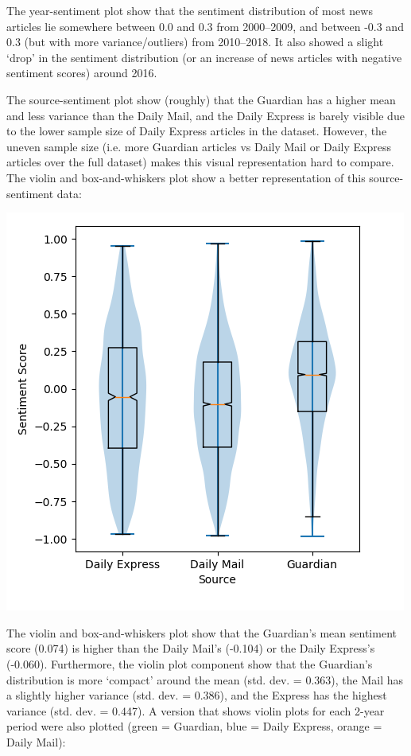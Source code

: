 \documentclass{report}
\begin{document}
The year-sentiment plot show that the sentiment distribution of most news articles lie somewhere between 0.0 and 0.3 from 2000--2009, and between -0.3 and 0.3 (but with more variance/outliers) from 2010--2018. 
It also showed a slight `drop' in the sentiment distribution (or an increase of news articles with negative sentiment scores) around 2016.

The source-sentiment plot show (roughly) that the Guardian has a higher mean and less variance than the Daily Mail, and the Daily Express is barely visible due to the lower sample size of Daily Express articles in the dataset.
However, the uneven sample size (i.e. more Guardian articles vs Daily Mail or Daily Express articles over the full dataset) makes this visual representation hard to compare. The violin \cite{hintze1998violin} and box-and-whiskers plot \cite{tukey1977exploratory} show a better representation of this source-sentiment data:

\begin{center}
	\includegraphics[width=0.5\linewidth]{row-3-col-1.png}
\end{center}

The violin and box-and-whiskers plot show that the Guardian's mean sentiment score (0.074) is higher than the Daily Mail's (-0.104) or the Daily Express's (-0.060).
Furthermore, the violin plot component show that the Guardian's distribution is more `compact' around the mean (std. dev. = 0.363), the Mail has a slightly higher variance (std. dev. = 0.386), and the Express has the highest variance (std. dev. = 0.447). A version that shows violin plots for each 2-year period were also plotted (green = Guardian, blue = Daily Express, orange = Daily Mail):
\end{document}
